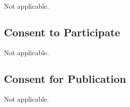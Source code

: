 Not applicable.
	
\subsection*{Consent to Participate}
	
Not applicable.
	
\subsection*{Consent for Publication}
	
Not applicable.
	
	
	
	
	
	
	
	
	
	
